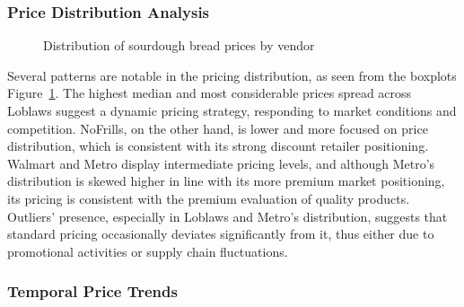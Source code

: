 \documentclass[
  letterpaper,
  DIV=11,
  numbers=noendperiod]{scrartcl}
\begin{document}
\subsubsection{Price Distribution
Analysis}\label{price-distribution-analysis}

\begin{figure}[H]


\caption{\label{fig-price-dist}Distribution of sourdough bread prices by
vendor}

\end{figure}%

Several patterns are notable in the pricing distribution, as seen from
the boxplots Figure~\ref{fig-price-dist}. The highest median and most
considerable prices spread across Loblaws suggest a dynamic pricing
strategy, responding to market conditions and competition. NoFrills, on
the other hand, is lower and more focused on price distribution, which
is consistent with its strong discount retailer positioning. Walmart and
Metro display intermediate pricing levels, and although Metro's
distribution is skewed higher in line with its more premium market
positioning, its pricing is consistent with the premium evaluation of
quality products. Outliers' presence, especially in Loblaws and Metro's
distribution, suggests that standard pricing occasionally deviates
significantly from it, thus either due to promotional activities or
supply chain fluctuations.

\subsubsection{Temporal Price Trends}\label{temporal-price-trends}
\end{document}

